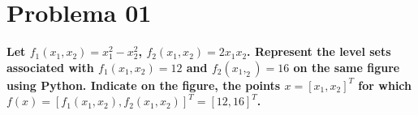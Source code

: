 \section*{Problema 01}

\textbf{Let $f_1(x_1,x_2)=x_1^2-x_2^2$, $f_2(x_1,x_2)=2x_1x_2$. Represent the level sets associated with $f_1(x_1,x_2)=12$ and $f_2(x_1,_2)=16$ on the same figure using Python. Indicate on the figure, the points $x=[x_1,x_2]^T$ for which $f(x)=[f_1(x_1,x_2),f_2(x_1,x_2)]^T=[12,16]^T$.}